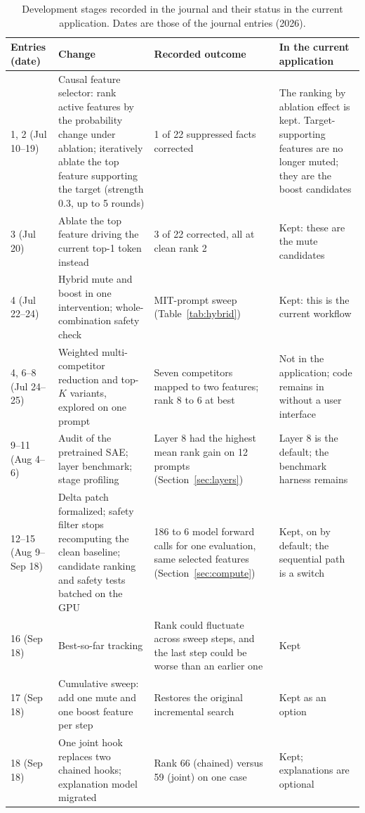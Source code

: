 \documentclass[conference]{IEEEtran}
\newcommand{\code}[1]{\texttt{\detokenize{#1}}}
\begin{document}
\begin{table}[t]
\caption{Development stages recorded in the journal and their status in the current application. Dates are those of the journal entries (2026).}
\label{tab:history}
\centering\footnotesize
\begin{tabular}{@{}p{1.6cm}p{5.0cm}p{5.0cm}p{4.4cm}@{}}
\toprule
Entries (date) & Change & Recorded outcome & In the current application\\
\midrule
1, 2 (Jul 10--19) & Causal feature selector: rank active features by the probability change under ablation; iteratively ablate the top feature supporting the target (strength 0.3, up to 5 rounds) & 1 of 22 suppressed facts corrected & The ranking by ablation effect is kept. Target-supporting features are no longer muted; they are the boost candidates\\
3 (Jul 20) & Ablate the top feature driving the current top-1 token instead & 3 of 22 corrected, all at clean rank 2 & Kept: these are the mute candidates\\
4 (Jul 22--24) & Hybrid mute and boost in one intervention; whole-combination safety check & MIT-prompt sweep (Table~\ref{tab:hybrid}) & Kept: this is the current workflow\\
4, 6--8 (Jul 24--25) & Weighted multi-competitor reduction and top-$K$ variants, explored on one prompt & Seven competitors mapped to two features; rank 8 to 6 at best & Not in the application; code remains in \code{src/editing.py} without a user interface\\
9--11 (Aug 4--6) & Audit of the pretrained SAE; layer benchmark; stage profiling & Layer 8 had the highest mean rank gain on 12 prompts (Section~\ref{sec:layers}) & Layer 8 is the default; the benchmark harness remains\\
12--15 (Aug 9--Sep 18) & Delta patch formalized; safety filter stops recomputing the clean baseline; candidate ranking and safety tests batched on the GPU & 186 to 6 model forward calls for one evaluation, same selected features (Section~\ref{sec:compute}) & Kept, on by default; the sequential path is a switch\\
16 (Sep 18) & Best-so-far tracking & Rank could fluctuate across sweep steps, and the last step could be worse than an earlier one & Kept\\
17 (Sep 18) & Cumulative sweep: add one mute and one boost feature per step & Restores the original incremental search & Kept as an option\\
18 (Sep 18) & One joint hook replaces two chained hooks; explanation model migrated & Rank 66 (chained) versus 59 (joint) on one case & Kept; explanations are optional\\

\end{tabular}
\end{table}
\end{document}
